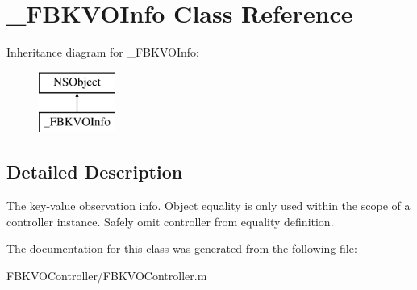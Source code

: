 \hypertarget{interface___f_b_k_v_o_info}{\section{\+\_\+\+F\+B\+K\+V\+O\+Info Class Reference}
\label{interface___f_b_k_v_o_info}
}
Inheritance diagram for \+\_\+\+F\+B\+K\+V\+O\+Info\+:\begin{figure}[H]
\begin{center}
\leavevmode
\includegraphics[height=2.000000cm]{interface___f_b_k_v_o_info}
\end{center}
\end{figure}


\subsection{Detailed Description}
The key-\/value observation info.  Object equality is only used within the scope of a controller instance. Safely omit controller from equality definition. 

The documentation for this class was generated from the following file\+:\begin{DoxyCompactItemize}
\item 
F\+B\+K\+V\+O\+Controller/F\+B\+K\+V\+O\+Controller.\+m\end{DoxyCompactItemize}
